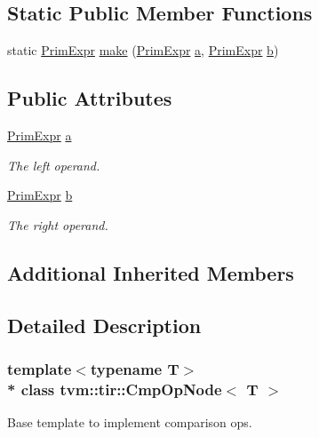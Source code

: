 \subsection*{Static Public Member Functions}
\begin{DoxyCompactItemize}
\item 
static \hyperlink{classtvm_1_1PrimExpr}{Prim\+Expr} \hyperlink{classtvm_1_1tir_1_1CmpOpNode_ac85647862e83e536661338213ceba395}{make} (\hyperlink{classtvm_1_1PrimExpr}{Prim\+Expr} \hyperlink{classtvm_1_1tir_1_1CmpOpNode_a977090c87be81b9cf78e4dd68a657665}{a}, \hyperlink{classtvm_1_1PrimExpr}{Prim\+Expr} \hyperlink{classtvm_1_1tir_1_1CmpOpNode_ac6835db7e2eff5d198fd3942cf80c2a4}{b})
\end{DoxyCompactItemize}
\subsection*{Public Attributes}
\begin{DoxyCompactItemize}
\item 
\hyperlink{classtvm_1_1PrimExpr}{Prim\+Expr} \hyperlink{classtvm_1_1tir_1_1CmpOpNode_a977090c87be81b9cf78e4dd68a657665}{a}
\begin{DoxyCompactList}\small\item\em The left operand. \end{DoxyCompactList}\item 
\hyperlink{classtvm_1_1PrimExpr}{Prim\+Expr} \hyperlink{classtvm_1_1tir_1_1CmpOpNode_ac6835db7e2eff5d198fd3942cf80c2a4}{b}
\begin{DoxyCompactList}\small\item\em The right operand. \end{DoxyCompactList}\end{DoxyCompactItemize}
\subsection*{Additional Inherited Members}


\subsection{Detailed Description}
\subsubsection*{template$<$typename T$>$\\*
class tvm\+::tir\+::\+Cmp\+Op\+Node$<$ T $>$}

Base template to implement comparison ops. 


